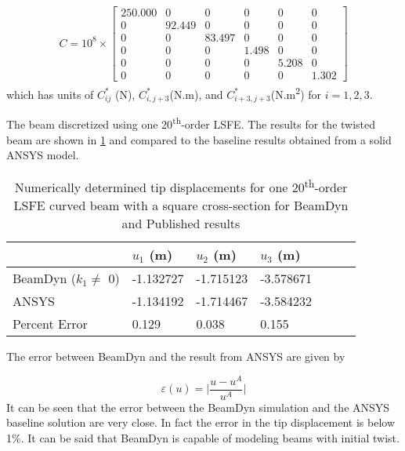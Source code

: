\documentclass[letterpaper,12pt]{article}
\begin{document}
\begin{align*} 
C =10^8 \times \begin{bmatrix}
	250.000 & 0   & 0   & 0  & 0    & 0    \\
	0  & 92.449 & 0   & 0  & 0    & 0    \\
	0  & 0   & 83.497 & 0  & 0    & 0    \\
	0  & 0   & 0   & 1.498 & 0    & 0    \\
	0  & 0   & 0   & 0  & 5.208 & 0    \\
	0  & 0   & 0   & 0  & 0    & 1.302
\end{bmatrix}
\end{align*}
which has units of $C^*_{ij}$ (N), $C^*_{i,j+3}$(N.m), and $C^*_{i+3, j+3}$(N.m\textsuperscript{2}) for $i=1, 2, 3$.

The beam discretized using one 20\textsuperscript{th}-order LSFE. The results for the twisted beam are shown in \ref{tab:twist} and compared to the baseline results obtained from a solid ANSYS model.

\begin{table}
\caption{\label{tab:twist}Numerically determined tip displacements for one 20\textsuperscript{th}-order LSFE  curved beam with a square cross-section for BeamDyn and Published results } 
\begin{center} 
    \begin{tabular}{| l | l | l | l | l | l | l |}
    	\hline
    	        & $u_1$ (m) & $u_2$ (m) & $u_3$ (m)  \\ \hline
    	BeamDyn ($k_1 \neq$ 0) & -1.132727     & -1.715123       & -3.578671      \\  \hline
    	ANSYS   & -1.134192     & -1.714467      & -3.584232     \\ \hline
    	Percent Error   & 0.129     & 0.038      & 0.155     \\ \hline
    \end{tabular}
\end{center}
\end{table} 

The error between BeamDyn and the result from ANSYS are given by

\begin{equation}
\label{eq. 5.7}
\varepsilon(u)=\bigg|\frac{u-u^A}{u^A}\bigg|
\end{equation}
It can be seen that the error between the BeamDyn simulation and the ANSYS baseline solution are very close. In fact the error in the tip displacement is below 1\%. It can be said that BeamDyn is capable of modeling beams with initial twist.
\newpage
\end{document}
